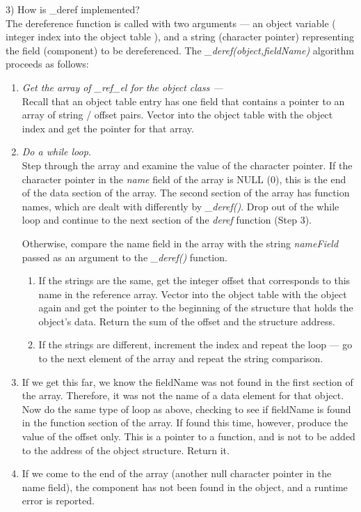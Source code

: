 3) How is \_deref implemented?\\
The dereference function is called with two arguments ---
an object variable
( integer index into the object table ), and a string (character
pointer) representing the field (component) to be dereferenced.
The {\em \_deref(object,fieldName)} algorithm proceeds as follows:
\begin{enumerate}
\item {\em Get the array of \_ref\_el for the object class ---\\}
Recall that an object table entry has one field that contains a pointer to
an array of string / offset pairs.  Vector into the object
table with the object
index and get the pointer for that array.
\item {\em Do a while loop.\\}
Step through the array and examine the value of the
character pointer.
If the character pointer in the {\em name} field of the array is NULL (0), this
is the end of the data section of the array.  The second section of the
array has function names, which are dealt with differently by {\em \_deref()}.
Drop out of the while loop and continue to the next section of the {\em deref}
function (Step 3).

Otherwise, compare the name field in the array with
the string {\em nameField} passed as an argument to the {\em \_deref()}
function.
\begin{enumerate}
\item
If the strings are the same, get the integer offset that corresponds to
this name in the reference array.
Vector into the object table with the object
again and get the pointer to the beginning of the structure that holds
the object's data.  Return the sum of the offset and the structure
address.
\item
If the strings are different, increment the index and repeat the loop ---
go to the next element of the array and repeat the string comparison.
\end{enumerate}
\item
If we get this far, we know the fieldName was not found in the first section
of the array.  Therefore, it was not the name of a data element for that object.
Now do the same type of loop as above, checking to see if fieldName is found
in the function section of the array.  If found this time, however, produce
the value of the offset only.  This is a pointer to a function, and is
not to be added to the address of the object structure.  Return it.
\item
If we come to the end of the array (another null character pointer in the
name field), the component has not been found in the object, and a runtime
error is reported.
\end{enumerate}

